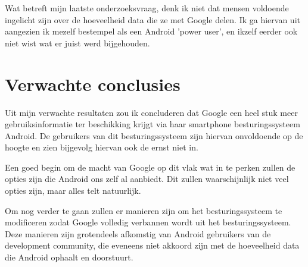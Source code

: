 \vspace{2mm}

Wat betreft mijn laatste onderzoeksvraag, denk ik niet dat mensen voldoende ingelicht zijn over de hoeveelheid data die ze met Google delen. Ik ga hiervan uit aangezien ik mezelf bestempel als een Android 'power user', en ikzelf eerder ook niet wist wat er juist werd bijgehouden.


\section{Verwachte conclusies}
\label{sec:verwachte_conclusies}


Uit mijn verwachte resultaten zou ik concluderen dat Google een heel stuk meer gebruiksinformatie ter beschikking krijgt via haar smartphone besturingssysteem Android. De gebruikers van dit besturingssysteem zijn hiervan onvoldoende op de hoogte en zien bijgevolg hiervan ook de ernst niet in.

Een goed begin om de macht van Google op dit vlak wat in te perken zullen de opties zijn die Android ons zelf al aanbiedt. Dit zullen waarschijnlijk niet veel opties zijn, maar alles telt natuurlijk. 

Om nog verder te gaan zullen er manieren zijn om het besturingssysteem te modificeren zodat Google volledig verbannen wordt uit het besturingssysteem. Deze manieren zijn grotendeels afkomstig van Android gebruikers van de development community, die eveneens niet akkoord zijn met de hoeveelheid data die Android ophaalt en doorstuurt.


